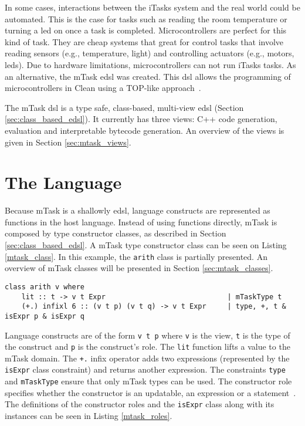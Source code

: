 In some cases, interactions between the iTasks system and the real world could be automated. This is the case for tasks such as reading the room temperature or turning a \acs{led} on once a task is completed. Microcontrollers are perfect for this kind of task. They are cheap systems that great for control tasks that involve reading sensors (e.g., temperature, light) and controlling actuators (e.g., motors, \acsp{led}). Due to hardware limitations, microcontrollers can not run iTasks tasks. As an alternative, the mTask \ac{edsl} was created. This \ac{dsl} allows the programming of microcontrollers in Clean using a TOP-like approach~\cite{micro,mtasks,martthesis}.

The mTask \ac{dsl} is a type safe, class-based, multi-view \ac{edsl} (Section \ref{sec:class_based_edsl}). It currently has three views: C++ code generation, evaluation and interpretable bytecode generation. An overview of the views is given in Section \ref{sec:mtask_views}.

\section{The Language}
Because mTask is a shallowly \ac{edsl}, language constructs are represented as functions in the host language. Instead of using functions directly, mTask is composed by type constructor classes, as described in Section \ref{sec:class_based_edsl}. A mTask type constructor class can be seen on Listing \ref{mtask_class}. In this example, the \texttt{arith} class is partially presented. An overview of mTask classes will be presented in Section \ref{sec:mtask_classes}.

\begin{lstlisting}[caption=A mTask class,captionpos=b,label=mtask_class]
class arith v where
    lit :: t -> v t Expr                             | mTaskType t                       
    (+.) infixl 6 :: (v t p) (v t q) -> v t Expr     | type, +, t & isExpr p & isExpr q
\end{lstlisting}

Language constructs are of the form \texttt{v t p} where \texttt{v} is the view, \texttt{t} is the type of the construct and \texttt{p} is the construct's role. The \texttt{lit} function lifts a value to the mTask domain. The \texttt{+.} infix operator adds two expressions (represented by the \texttt{isExpr} class constraint) and returns another expression. The constraints \texttt{type} and \texttt{mTaskType} ensure that only mTask types can be used. The constructor role specifies whether the constructor is an updatable, an expression or a statement~\cite{mtasks,martthesis}. The definitions of the constructor roles and the \texttt{isExpr} class along with its instances can be seen in Listing \ref{mtask_roles}.

